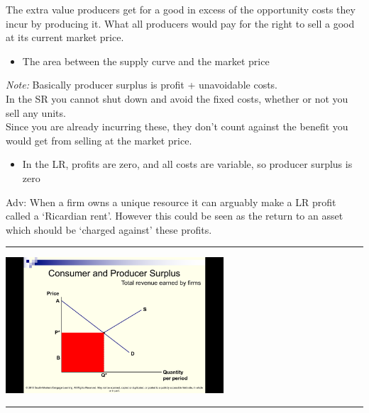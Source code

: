 \documentclass[]{article}
\providecommand{\tightlist}{%
  \setlength{\itemsep}{0pt}\setlength{\parskip}{0pt}}
\begin{document}
\bigskip

\begin{description}
\tightlist
\item[Producer surplus (reprise)]
The extra value producers get for a good in excess of the opportunity
costs they incur by producing it. What all producers would pay for the
right to sell a good at its current market price.
\end{description}

\begin{itemize}
\tightlist
\item
  The area between the supply curve and the market price
\end{itemize}

\emph{Note:} Basically producer surplus is profit + unavoidable costs.\\
In the SR you cannot shut down and avoid the fixed costs, whether or not
you sell any units.\\
Since you are already incurring these, they don't count against the
benefit you would get from selling at the market price.

\begin{itemize}
\tightlist
\item
  In the LR, profits are zero, and all costs are variable, so producer
  surplus is zero
\end{itemize}

Adv: When a firm owns a unique resource it can arguably make a LR profit
called a `Ricardian rent'. However this could be seen as the return to
an asset which should be `charged against' these profits.

\begin{center}\rule{0.5\linewidth}{\linethickness}\end{center}

\includegraphics[height=2in]{picsfigs/prodsurp1.png}

\begin{center}\rule{0.5\linewidth}{\linethickness}\end{center}
\end{document}
